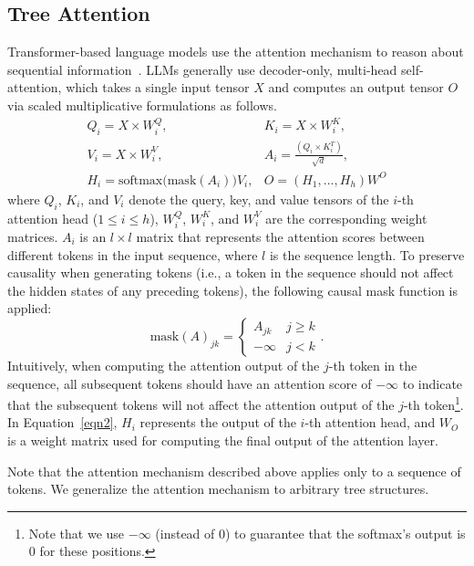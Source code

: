 \subsection{Tree Attention}
\label{subsec:tree_attention}
Transformer-based language models use the attention mechanism to reason about sequential information~\cite{vaswani2017attention}.
LLMs generally use decoder-only, multi-head self-attention, which takes a single input tensor $X$ and computes an output tensor $O$ via scaled multiplicative formulations as follows.
\begin{eqnarray}
    Q_i = X \times W_i^Q, & K_i = X \times W_i^K, \\
    V_i = X \times W_i^V, & A_i = \frac{(Q_i \times K_i^T)}{\sqrt{d}}, \\
    H_i = \textrm{softmax}\big(\textrm{mask}(A_i)\big) V_i, & O = (H_1, ...,H_h) W^O 
    \label{eqn2}
\end{eqnarray}
where $Q_i$, $K_i$, and $V_i$ denote the query, key, and value tensors of the $i$-th attention head ($1\leq i \leq h$), $W_i^Q$, $W_i^K$, and $W_i^V$ are the corresponding weight matrices. 
$A_i$ is an $l\times l$ matrix that represents the attention scores between different tokens in the input sequence, where $l$ is the sequence length. To preserve causality when generating tokens (i.e., a token in the sequence should not affect the hidden states of any preceding tokens), the following causal mask function is applied:
\begin{equation}
    \textrm{mask}(A)_{jk} =     \begin{cases}
    A_{jk} & j \geq k\\
    - \infty & j < k 
    \end{cases}.
\end{equation}
Intuitively, when computing the attention output of the $j$-th token in the sequence, all subsequent tokens should have an attention score of $-\infty$ to indicate that the subsequent tokens will not affect the attention output of the $j$-th token\footnote{Note that we use $-\infty$ (instead of 0) to guarantee that the softmax's output is 0 for these positions.}. 
In Equation~\ref{eqn2}, $H_i$ represents the output of the $i$-th attention head, and $W_O$ is a weight matrix used for computing the final output of the attention layer.

Note that the attention mechanism described above applies only to a sequence of tokens. We generalize the attention mechanism to arbitrary tree structures.

